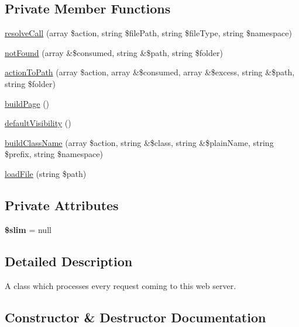 \subsection*{Private Member Functions}
\begin{DoxyCompactItemize}
\item 
\hyperlink{class_lora_1_1_request_handler_a6fc4ced934cdeb3ef1d5a207ffb2a1e1}{resolve\+Call} (array \$action, string \$file\+Path, string \$file\+Type, string \$namespace)
\item 
\hyperlink{class_lora_1_1_request_handler_ae7fce8bd5541f74398edeacf161f72b9}{not\+Found} (array \&\$consumed, string \&\$path, string \$folder)
\item 
\hyperlink{class_lora_1_1_request_handler_a9b2ad6505d2d31b163bc604a408b9d54}{action\+To\+Path} (array \$action, array \&\$consumed, array \&\$excess, string \&\$path, string \$folder)
\item 
\hyperlink{class_lora_1_1_request_handler_a68984a50c94ba368351f0d61c5c5b56f}{build\+Page} ()
\item 
\hyperlink{class_lora_1_1_request_handler_a21e3da9cd03587113aa6b667a85ec074}{default\+Visibility} ()
\item 
\hyperlink{class_lora_1_1_request_handler_a43dc00f2b210386e405dc0436baeb0d6}{build\+Class\+Name} (array \$action, string \&\$class, string \&\$plain\+Name, string \$prefix, string \$namespace)
\item 
\hyperlink{class_lora_1_1_request_handler_a682ba4d861fca3057999641c16da8475}{load\+File} (string \$path)
\end{DoxyCompactItemize}
\subsection*{Private Attributes}
\begin{DoxyCompactItemize}
\item 
\mbox{\label{class_lora_1_1_request_handler_acfcdba42d947eb8c034b44898adda679}} 
{\bfseries \$slim} = null
\end{DoxyCompactItemize}


\subsection{Detailed Description}
A class which processes every request coming to this web server. 

\subsection{Constructor \& Destructor Documentation}
\mbox{\label{class_lora_1_1_request_handler_ae94f71807587d45d185150087e3c313d}} 

